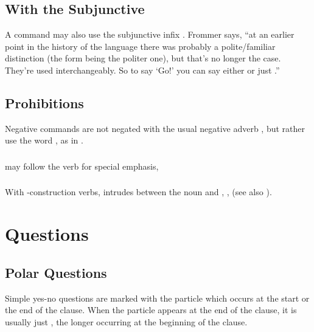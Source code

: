 \subsection{With the Subjunctive} A command may also use the
subjunctive infix . Frommer says, ``at an earlier point in
the history of the language there was probably a polite/familiar
distinction (the  form being the politer one), but that's no
longer the case. They're used interchangeably.  So to say `Go!' you can
say either  or just .''

\subsection{Prohibitions} Negative commands are not negated with the
usual negative adverb , but rather use the word , as in
 .
\label{syntax:prohibitions}

\subsubsection{}  may follow the verb for special emphasis,
 

\subsubsection{} With -construction verbs,  intrudes
between the noun and ,  ,
  (see also
).



\section{Questions}
\subsection{Polar Questions} 
Simple yes-no questions are marked with the particle  which
occurs at the start or the end of the clause.  When the particle
appears at the end of the clause, it is usually just , the
longer  occurring at the beginning of the
clause.   

